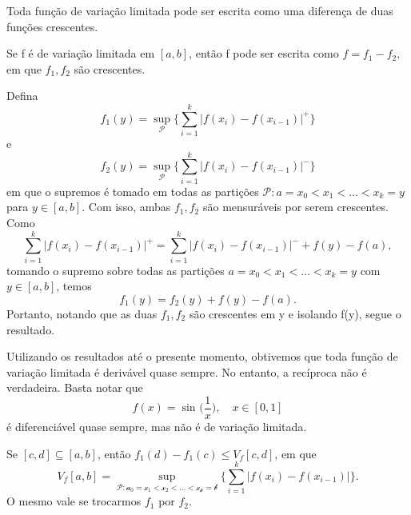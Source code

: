 \documentclass[MeasureTheory/measure_theory.tex]{subfiles}
\begin{document}
Toda função de variação limitada pode ser escrita como uma diferença de duas funções crescentes.
\begin{lemma*}
	Se f é de variação limitada em \([a, b]\), então f pode ser escrita como \(f= f_1 - f_2,\) em que \(f_1, f_2\) são crescentes.
\end{lemma*}
\begin{proof*}
	Defina
	\[
		f_1(y) = \sup_{\mathcal{P}}\biggl\{\sum\limits_{i=1}^{k}|f(x_{i})-f(x_{i-1})|^{+}\biggr\}
	\]
	e
	\[
		f_2(y) = \sup_{\mathcal{P}}\biggl\{\sum\limits_{i=1}^{k}|f(x_{i})-f(x_{i-1})|^{-}\biggr\}
	\]
	em que o supremos é tomado em todas as partições \(\mathcal{P}: a = x_{0} < x_1 < \dotsc < x_{k} = y\) para \(y\in [a, b].\) Com isso, ambas \(f_1, f_2\) são mensuráveis por serem crescentes.
	Como
	\[
		\sum\limits_{i=1}^{k}|f(x_{i}) - f(x_{i-1})|^{+} = \sum\limits_{i=1}^{k}|f(x_{i}) - f(x_{i-1})|^{-} + f(y) - f(a),
	\]
	tomando o supremo sobre todas as partições \(a=x_{0} < x_1 <\dotsc <x_{k} = y\) com \(y\in [a, b]\), temos
	\[
		f_1(y) = f_2(y) + f(y) - f(a).
	\]
	Portanto, notando que as duas \(f_1, f_2\) são crescentes em y e isolando f(y), segue o resultado. \qedsymbol
\end{proof*}
Utilizando os resultados até o presente momento, obtivemos que toda função de variação limitada é derivável quase sempre. No entanto, a recíproca não é verdadeira. Basta notar que
\[
	f(x) = \sin^{}{\biggl(\frac{1}{x}\biggr)},\quad x\in [0, 1]
\]
é diferenciável quase sempre, mas não é de variação limitada.
\begin{lemma*}
	Se \([c, d]\subseteq [a, b]\), então \(f_1(d) - f_1(c)\leq V_f[c, d]\), em que
	\[
		V_f[a, b] = \sup_{\mathcal{P:a_{0}=x_1 < x_2 < \dotsc <x_{k}=b}}\biggl\{\sum\limits_{i=1}^{k}|f(x_{i}) - f(x_{i-1})|\biggr\}.
	\]
	O mesmo vale se trocarmos \(f_1\) por \(f_2\).
\end{lemma*}
\end{document}
